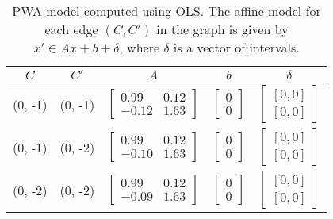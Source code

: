 \label{fig:vdp-cont}

\label{fig:vdp-abs}

\label{fig:vdp-map}

\label{fig:vdp-graph}

\begin{table}[!htbp]
\centering
\caption{PWA model computed using OLS. The affine model for each edge $(C,C')$ in the graph  is given by $x'\in Ax + b + \delta$, where $\delta$ is a vector of intervals.}
\label{tab:vdp-pwa}
\begin{tabular}{@{}ccccc@{}}
\toprule
$C$ & $C'$ & $A$ & $b$ & $\delta$\\
\midrule
(0, -1)   & (0, -1)   & $\begin{bmatrix}0.99& 0.12 \\-0.12&1.63\end{bmatrix}$&$\begin{bmatrix}0\\0\end{bmatrix}  $&$\begin{bmatrix}[0, 0]\\ [0, 0]\end{bmatrix}$\\
(0, -1)   & (0, -2)   & $\begin{bmatrix}0.99& 0.12 \\-0.10&1.63\end{bmatrix}$&$\begin{bmatrix}0\\0\end{bmatrix}  $&$\begin{bmatrix}[0, 0]\\ [0, 0]\end{bmatrix}$\\
\midrule
(0, -2)   & (0, -2)   & $\begin{bmatrix}0.99& 0.12 \\-0.09&1.63\end{bmatrix}$&$\begin{bmatrix}0\\0\end{bmatrix}  $&$\begin{bmatrix}[0, 0]\\ [0, 0]\end{bmatrix}$\\

\end{tabular}
\end{table}
